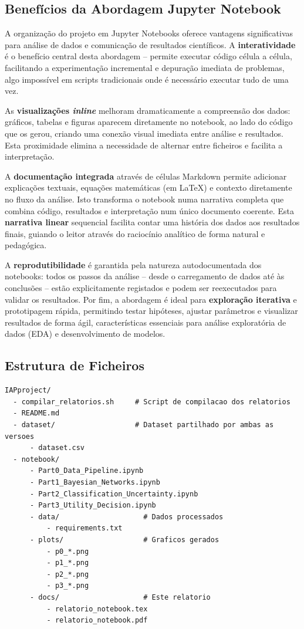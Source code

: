 \documentclass[12pt, a4paper]{article}
\begin{document}
\subsection{Benefícios da Abordagem Jupyter Notebook}

A organização do projeto em Jupyter Notebooks oferece vantagens significativas para análise de dados e comunicação de resultados científicos. A \textbf{interatividade} é o benefício central desta abordagem -- permite executar código célula a célula, facilitando a experimentação incremental e depuração imediata de problemas, algo impossível em scripts tradicionais onde é necessário executar tudo de uma vez.

As \textbf{visualizações \textit{inline}} melhoram dramaticamente a compreensão dos dados: gráficos, tabelas e figuras aparecem diretamente no notebook, ao lado do código que os gerou, criando uma conexão visual imediata entre análise e resultados. Esta proximidade elimina a necessidade de alternar entre ficheiros e facilita a interpretação.

A \textbf{documentação integrada} através de células Markdown permite adicionar explicações textuais, equações matemáticas (em LaTeX) e contexto diretamente no fluxo da análise. Isto transforma o notebook numa narrativa completa que combina código, resultados e interpretação num único documento coerente. Esta \textbf{narrativa linear} sequencial facilita contar uma história dos dados aos resultados finais, guiando o leitor através do raciocínio analítico de forma natural e pedagógica.

A \textbf{reprodutibilidade} é garantida pela natureza autodocumentada dos notebooks: todos os passos da análise -- desde o carregamento de dados até às conclusões -- estão explicitamente registados e podem ser reexecutados para validar os resultados. Por fim, a abordagem é ideal para \textbf{exploração iterativa} e prototipagem rápida, permitindo testar hipóteses, ajustar parâmetros e visualizar resultados de forma ágil, características essenciais para análise exploratória de dados (EDA) e desenvolvimento de modelos.

\subsection{Estrutura de Ficheiros}

\begin{verbatim}
IAPproject/
  - compilar_relatorios.sh     # Script de compilacao dos relatorios
  - README.md
  - dataset/                   # Dataset partilhado por ambas as versoes
      - dataset.csv
  - notebook/
      - Part0_Data_Pipeline.ipynb
      - Part1_Bayesian_Networks.ipynb
      - Part2_Classification_Uncertainty.ipynb
      - Part3_Utility_Decision.ipynb
      - data/                    # Dados processados
          - requirements.txt
      - plots/                   # Graficos gerados
          - p0_*.png
          - p1_*.png
          - p2_*.png
          - p3_*.png
      - docs/                    # Este relatorio
          - relatorio_notebook.tex
          - relatorio_notebook.pdf
\end{verbatim}
\end{document}
